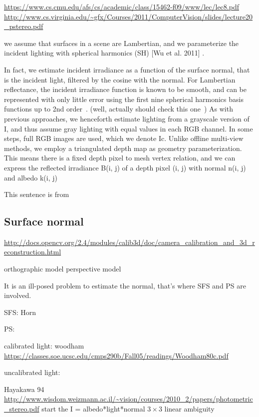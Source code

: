 \url{https://www.cs.cmu.edu/afs/cs/academic/class/15462-f09/www/lec/lec8.pdf}
\url{http://www.cs.virginia.edu/~gfx/Courses/2011/ComputerVision/slides/lecture20_pstereo.pdf}


we assume that surfaces in a scene are Lambertian, and we parameterize the incident lighting with spherical harmonics (SH) [Wu et al. 2011] \cite{wu2011shading}.

In fact, we estimate incident irradiance as a function of the surface normal, that is the incident light, filtered by the cosine with the normal. For Lambertian reflectance, the incident irradiance function is known to be smooth, and can be represented with only little error using the first nine spherical harmonics basis functions up to 2nd order~\cite{ramamoorthi2001efficient}. (well, actually should check this one~\cite{ramamoorthi2001relationship})
As with previous approaches, we henceforth estimate lighting from a grayscale version of I, and thus assume gray lighting with equal values in each RGB channel. In some steps, full RGB images are used, which we denote Ic. Unlike offline multi-view methods, we employ a triangulated depth map as geometry parameterization. This means there is a fixed depth pixel to mesh vertex relation, and we can express the reflected irradiance B(i, j) of a depth pixel (i, j) with normal n(i, j) and albedo k(i, j)

This sentence is from\cite{wu2014real}


\subsection{Surface normal}
\url{http://docs.opencv.org/2.4/modules/calib3d/doc/camera_calibration_and_3d_reconstruction.html}

orthographic model
perspective model

It is an ill-posed problem to estimate the normal, that's where SFS and PS are involved. 

SFS:
Horn

PS:

calibrated light: woodham~\cite{woodham1980photometric} \url{https://classes.soe.ucsc.edu/cmps290b/Fall05/readings/Woodham80c.pdf}

uncalibrated light:

Hayakawa 94~\cite{hayakawa1994photometric} \url{http://www.wisdom.weizmann.ac.il/~vision/courses/2010_2/papers/photometric_stereo.pdf}
start the I = albedo*light*normal $3\times3$ linear ambiguity

